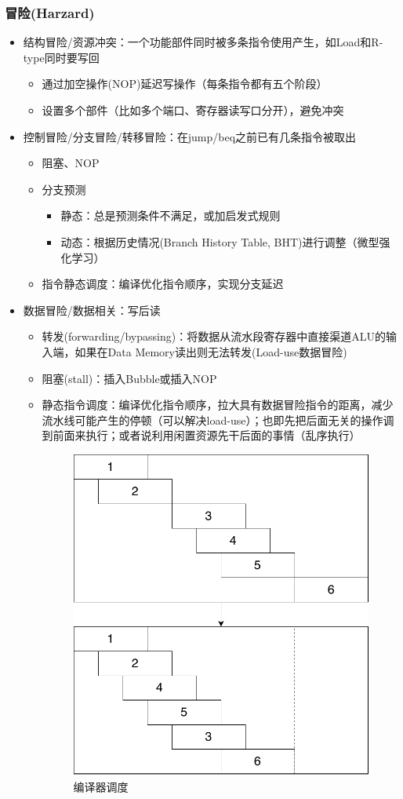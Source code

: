 \subsubsection{冒险(Harzard)}
\begin{itemize}
	\item 结构冒险/资源冲突：一个功能部件同时被多条指令使用产生，如Load和R-type同时要写回
	\begin{itemize}
		\item 通过加空操作(NOP)延迟写操作（每条指令都有五个阶段）
		\item 设置多个部件（比如多个端口、寄存器读写口分开），避免冲突
	\end{itemize}
	\item 控制冒险/分支冒险/转移冒险：在jump/beq之前已有几条指令被取出
	\begin{itemize}
		\item 阻塞、NOP
		\item 分支预测
		\begin{itemize}
			\item 静态：总是预测条件不满足，或加启发式规则
			\item 动态：根据历史情况(Branch History Table, BHT)进行调整（微型强化学习）
		\end{itemize}
		\item 指令静态调度：编译优化指令顺序，实现分支延迟
	\end{itemize}
	\item 数据冒险/数据相关：写后读
	\begin{itemize}
		\item 转发(forwarding/bypassing)：将数据从流水段寄存器中直接渠道ALU的输入端，如果在Data Memory读出则无法转发(Load-use数据冒险)
		\item 阻塞(stall)：插入Bubble或插入NOP
		\item 静态指令调度：编译优化指令顺序，拉大具有数据冒险指令的距离，减少流水线可能产生的停顿（可以解决load-use）；也即先把后面无关的操作调到前面来执行；或者说利用闲置资源先干后面的事情（乱序执行）%
		\begin{figure}[htbp]
		\centering
		\includegraphics[width=0.3\linewidth]{fig/schedule.pdf}
		\caption{编译器调度}
		\end{figure}
	\end{itemize}
\end{itemize}

